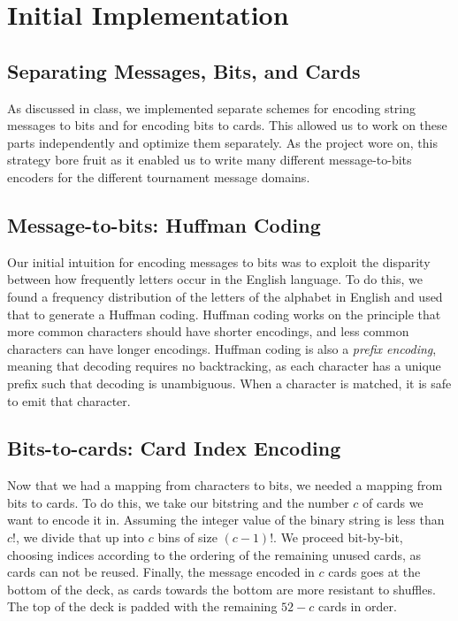 \documentclass[titlepage]{article}
\begin{document}
\section{Initial Implementation}

\subsection{Separating Messages, Bits, and Cards}
As discussed in class, we implemented separate schemes for encoding string messages to bits and for encoding bits to cards. This allowed us to work on these parts independently and optimize them separately. As the project wore on, this strategy bore fruit as it enabled us to write many different message-to-bits encoders for the different tournament message domains.

\subsection{Message-to-bits: Huffman Coding}
Our initial intuition for encoding messages to bits was to exploit the disparity between how frequently letters occur in the English language. To do this, we found a frequency distribution of the letters of the alphabet in English and used that to generate a Huffman coding. Huffman coding works on the principle that more common characters should have shorter encodings, and less common characters can have longer encodings. Huffman coding is also a \textit{prefix encoding}, meaning that decoding requires no backtracking, as each character has a unique prefix such that decoding is unambiguous. When a character is matched, it is safe to emit that character.

\subsection{Bits-to-cards: Card Index Encoding}
Now that we had a mapping from characters to bits, we needed a mapping from bits to cards. To do this, we take our bitstring and the number $c$ of cards we want to encode it in. Assuming the integer value of the binary string is less than $c!$, we divide that up into $c$ bins of size $(c-1)!$. We proceed bit-by-bit, choosing indices according to the ordering of the remaining unused cards, as cards can not be reused. Finally, the message encoded in $c$ cards goes at the bottom of the deck, as cards towards the bottom are more resistant to shuffles. The top of the deck is padded with the remaining $52-c$ cards in order.
\end{document}

